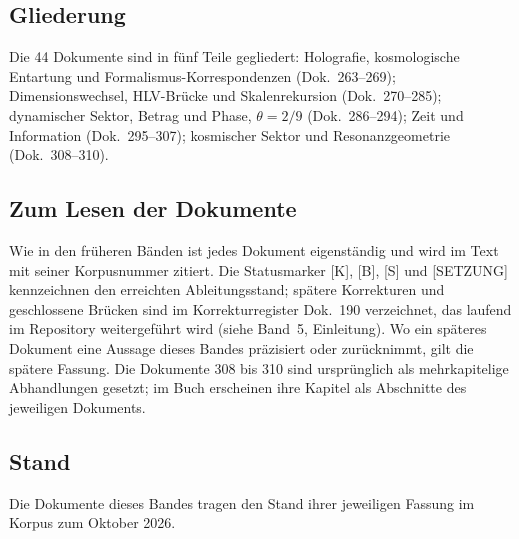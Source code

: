 \subsection*{Gliederung}

Die 44 Dokumente sind in fünf Teile gegliedert: Holografie, kosmologische
Entartung und Formalismus-Korrespondenzen (Dok.~263--269);
Dimensionswechsel, HLV-Brücke und Skalenrekursion (Dok.~270--285);
dynamischer Sektor, Betrag und Phase, $\theta=2/9$ (Dok.~286--294); Zeit und
Information (Dok.~295--307); kosmischer Sektor und Resonanzgeometrie
(Dok.~308--310).

\subsection*{Zum Lesen der Dokumente}

Wie in den früheren Bänden ist jedes Dokument eigenständig und wird im Text
mit seiner Korpusnummer zitiert. Die Statusmarker [K], [B], [S] und
[SETZUNG] kennzeichnen den erreichten Ableitungsstand; spätere Korrekturen
und geschlossene Brücken sind im Korrekturregister Dok.~190 verzeichnet,
das laufend im Repository weitergeführt wird (siehe Band~5, Einleitung). Wo ein späteres Dokument eine Aussage dieses
Bandes präzisiert oder zurücknimmt, gilt die spätere Fassung. Die Dokumente
308 bis 310 sind ursprünglich als mehrkapitelige Abhandlungen gesetzt; im
Buch erscheinen ihre Kapitel als Abschnitte des jeweiligen Dokuments.

\subsection*{Stand}

Die Dokumente dieses Bandes tragen den Stand ihrer jeweiligen Fassung im
Korpus zum Oktober 2026.

